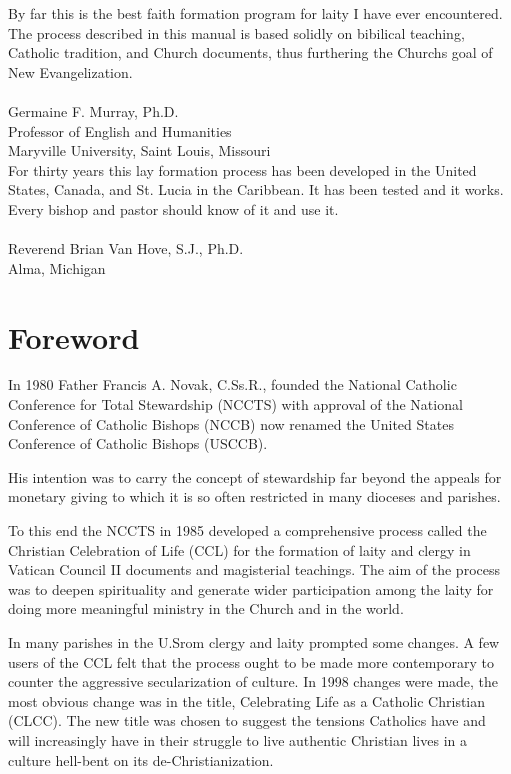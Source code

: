\documentclass[oneside]{book}
\begin{document}
By far this is the best faith formation program for laity I have ever
encountered. The process described in this manual is based solidly on bibilical
teaching, Catholic tradition, and Church documents, thus furthering the Churchs
goal of New Evangelization.
\\ \\
Germaine F. Murray, Ph.D. \\
Professor of English and Humanities \\
Maryville University, Saint Louis, Missouri \\

For thirty years this lay formation process has been developed in the United
States, Canada, and St. Lucia in the Caribbean. It has been tested and it
works. Every bishop and pastor should know of it and use it.
\\ \\
Reverend Brian Van Hove, S.J., Ph.D. \\
Alma, Michigan

\pagebreak


\pagestyle{plain}
\setcounter{page}{7}
\chapter{Foreword}


In 1980 Father Francis A. Novak, C.Ss.R., founded the National Catholic
Conference for Total Stewardship (NCCTS) with approval of the National
Conference of Catholic Bishops (NCCB) now renamed the United States Conference
of Catholic Bishops (USCCB).

His intention was to carry the concept of stewardship far beyond the appeals for
monetary giving to which it is so often restricted in many dioceses and
parishes.

To this end the NCCTS in 1985 developed a comprehensive process called the
Christian Celebration of Life (CCL) for the formation of laity and clergy in
Vatican Council II documents and magisterial teachings. The aim of the process
was to deepen spirituality and generate wider participation among the laity for
doing more meaningful ministry in the Church and in the world.

In many parishes in the U.Srom clergy and laity prompted some changes. A few
users of the CCL felt that the process ought to be made more contemporary to
counter the aggressive secularization of culture. In 1998 changes were made, the
most obvious change was in the title, Celebrating Life as a Catholic Christian
(CLCC). The new title was chosen to suggest the tensions Catholics have and will
increasingly have in their struggle to live authentic Christian lives in a
culture hell-bent on its de-Christianization.
\end{document}
